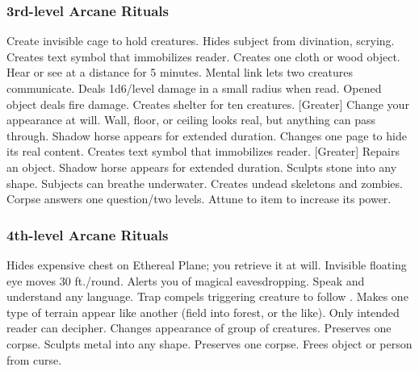 \subsubsection{3rd-level Arcane Rituals}
\begin{rituallist}
     Create invisible cage to hold creatures.
     Hides subject from divination, scrying.
     Creates text symbol that immobilizes reader.
     Creates one cloth or wood object.
     Hear or see at a distance for 5 minutes.
     Mental link lets two creatures communicate.
     Deals 1d6/level damage in a small radius when read.
     Opened object deals fire damage.
     Creates shelter for ten creatures.
    [Greater] Change your appearance at will.
     Wall, floor, or ceiling looks real, but anything can pass through.
     Shadow horse appears for extended duration.
     Changes one page to hide its real content.
     Creates text symbol that immobilizes reader.
    [Greater] Repairs an object.
     Shadow horse appears for extended duration.
     Sculpts stone into any shape.
     Subjects can breathe underwater.
     Creates undead skeletons and zombies.
     Corpse answers one question/two levels.
     Attune to item to increase its power.
\end{rituallist}

\subsubsection{4th-level Arcane Rituals}
\begin{rituallist}
    \F Hides expensive chest on Ethereal Plane; you retrieve it at will.
     Invisible floating eye moves 30 ft./round.
     Alerts you of magical eavesdropping.
     Speak and understand any language.
     Trap compels triggering creature to follow .
     Makes one type of terrain appear like another (field into forest, or the like).
     Only intended reader can decipher.
     Changes appearance of group of creatures.
     Preserves one corpse.
     Sculpts metal into any shape.
     Preserves one corpse.
     Frees object or person from curse.
\end{rituallist}

